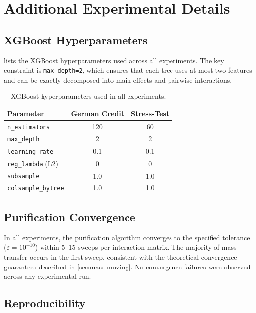 
\chapter{Additional Experimental Details}\label{app:details}

\section{XGBoost Hyperparameters}

 lists the XGBoost hyperparameters used across all experiments.
The key constraint is \texttt{max\_depth=2}, which ensures that each tree uses at most two features and can be exactly decomposed into main effects and pairwise interactions.

\begin{table}[H]
\centering
\small
\caption{XGBoost hyperparameters used in all experiments.}
\begin{tabular}{lcc}
\toprule
\textbf{Parameter} & \textbf{German Credit} & \textbf{Stress-Test} \\
\midrule
\texttt{n\_estimators} & 120 & 60 \\
\texttt{max\_depth} & 2 & 2 \\
\texttt{learning\_rate} & 0.1 & 0.1 \\
\texttt{reg\_lambda} (L2) & 0 & 0 \\
\texttt{subsample} & 1.0 & 1.0 \\
\texttt{colsample\_bytree} & 1.0 & 1.0 \\
\bottomrule
\end{tabular}
\label{tab:xgb-params}
\end{table}

\section{Purification Convergence}

In all experiments, the purification algorithm converges to the specified tolerance ($\varepsilon = 10^{-10}$) within 5--15 sweeps per interaction matrix.
The majority of mass transfer occurs in the first sweep, consistent with the theoretical convergence guarantees described in \cref{sec:mass-moving}.
No convergence failures were observed across any experimental run.

\section{Reproducibility}

